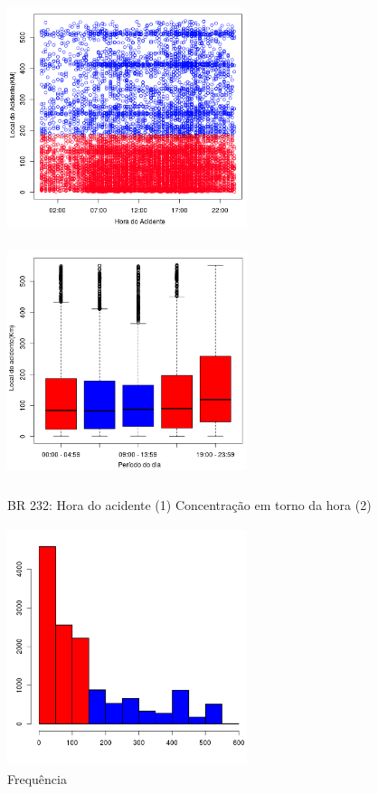 \begin{figure}[h]
	\caption{BR 232: Hora do acidente (1)  Concentração em torno da hora (2)}
	\includegraphics[width=7cm,height=7cm]{Figuras/Preprocess/br232_1.png}
	\includegraphics[width=7cm,height=7cm]{Figuras/Preprocess/br232_32.png}

\end{figure}

\quad \quad
\begin{figure}[h]
	\centering
	\caption{ Frequência}
	\includegraphics[width=7cm,height=7cm]{Figuras/Preprocess/br232_3.png}
\end{figure}


